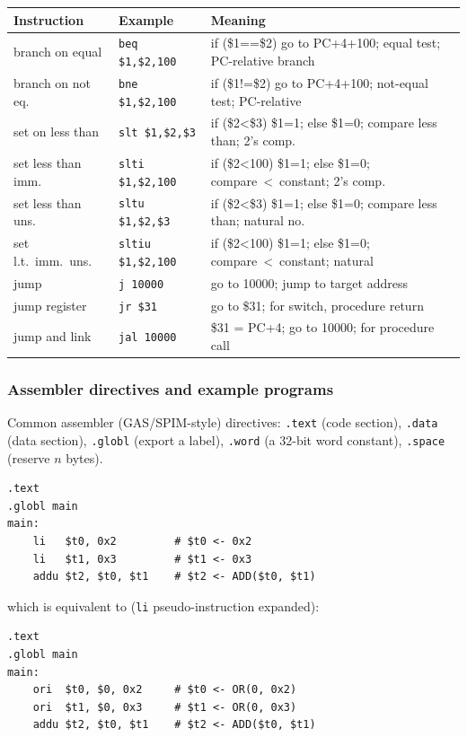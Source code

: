 \begin{center}
\begin{tabular}{@{}p{2.7cm}p{3cm}p{7.2cm}@{}}
\toprule
Instruction & Example & Meaning \\
\midrule
branch on equal & \texttt{beq \$1,\$2,100} & if (\$1==\$2) go to PC+4+100; equal test; PC-relative branch \\
branch on not eq.\ & \texttt{bne \$1,\$2,100} & if (\$1!=\$2) go to PC+4+100; not-equal test; PC-relative \\
set on less than & \texttt{slt \$1,\$2,\$3} & if (\$2<\$3) \$1=1; else \$1=0; compare less than; 2's comp. \\
set less than imm. & \texttt{slti \$1,\$2,100} & if (\$2<100) \$1=1; else \$1=0; compare~<~constant; 2's comp. \\
set less than uns. & \texttt{sltu \$1,\$2,\$3} & if (\$2<\$3) \$1=1; else \$1=0; compare less than; natural no.\ \\
set l.t.\ imm.\ uns. & \texttt{sltiu \$1,\$2,100} & if (\$2<100) \$1=1; else \$1=0; compare~<~constant; natural \\
jump            & \texttt{j 10000}   & go to 10000; jump to target address \\
jump register   & \texttt{jr \$31}   & go to \$31; for switch, procedure return \\
jump and link   & \texttt{jal 10000} & \$31 = PC+4; go to 10000; for procedure call \\
\bottomrule
\end{tabular}
\end{center}

\subsubsection{Assembler directives and example programs}

\begin{definition}
Common assembler (GAS/SPIM-style) directives: \texttt{.text} (code
section), \texttt{.data} (data section), \texttt{.globl} (export a label),
\texttt{.word} (a 32-bit word constant), \texttt{.space} (reserve $n$
bytes).
\end{definition}

\begin{eg}
\leavevmode
\begin{lstlisting}
.text
.globl main
main:
    li   $t0, 0x2         # $t0 <- 0x2
    li   $t1, 0x3         # $t1 <- 0x3
    addu $t2, $t0, $t1    # $t2 <- ADD($t0, $t1)
\end{lstlisting}
which is equivalent to (\texttt{li} pseudo-instruction expanded):
\begin{lstlisting}
.text
.globl main
main:
    ori  $t0, $0, 0x2     # $t0 <- OR(0, 0x2)
    ori  $t1, $0, 0x3     # $t1 <- OR(0, 0x3)
    addu $t2, $t0, $t1    # $t2 <- ADD($t0, $t1)
\end{lstlisting}
\end{eg}

